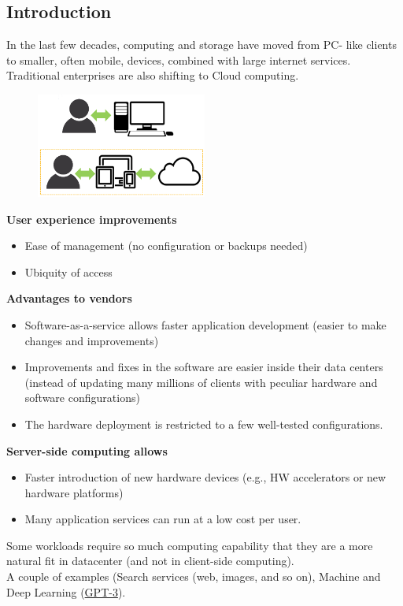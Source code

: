 \documentclass[10pt, oneside]{article}
\begin{document}
\subsection{Introduction}
In the last few decades, computing and storage have moved from PC- like clients to smaller, often mobile, devices, combined with large internet services.\\
Traditional enterprises are also shifting to Cloud computing.
\begin{figure}[H]
    \begin{center}
    \includegraphics[width=0.5\textwidth]{img/img3.png}
    \label{fig:computing and storage}
    \end{center}
\end{figure}

\begin{multicols}{3}
\noindent
{\bf User experience improvements}
\begin{itemize}
    \item Ease of management (no configuration or backups needed)
    \item Ubiquity of access
\end{itemize}

\columnbreak
\noindent
{\bf Advantages to vendors}
\begin{itemize}
    \item Software-as-a-service allows faster application development (easier to make changes and improvements)
    \item Improvements and fixes in the software are easier inside their data centers (instead of updating many millions of clients with peculiar hardware and software configurations)
    \item The hardware deployment is restricted to a few well-tested configurations.
\end{itemize}

\columnbreak
\noindent
{\bf Server-side computing allows}
\begin{itemize}
    \item Faster introduction of new hardware devices (e.g., HW accelerators or new hardware platforms)
    \item Many application services can run at a low cost per user.
\end{itemize}

\end{multicols}
Some workloads require so much computing capability that they are a more natural fit in datacenter (and not in client-side computing).\\
A couple of examples (Search services (web, images, and so on), Machine and Deep Learning (\href{https://www.theguardian.com/commentisfree/2020/sep/08/robot-wrote-this-article-gpt-3}{GPT-3}).
\end{document}
